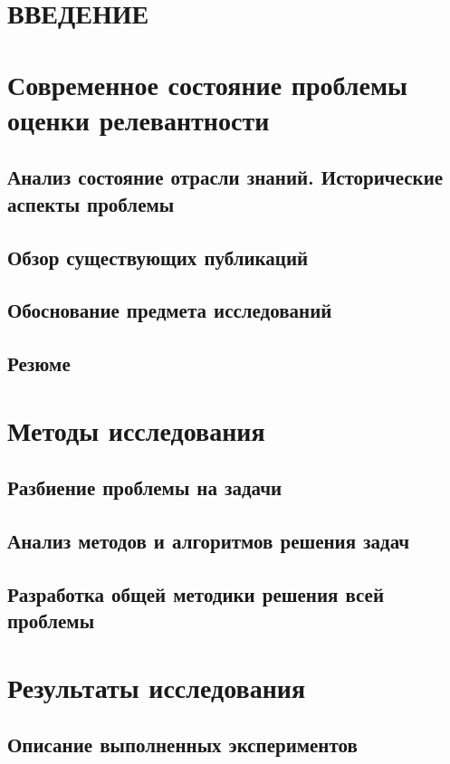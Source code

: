 \documentclass[a4paper,14pt,oneside,openany]{memoir}
\begin{document}
\sloppy

\tableofcontents*
\chapter*{ВВЕДЕНИЕ}

\chapter{Современное состояние проблемы оценки релевантности}
\section{Анализ состояние отрасли знаний. Исторические аспекты проблемы}

\section{Обзор существующих публикаций}

\section{Обоснование предмета исследований}

\section{Резюме}

\chapter{Методы исследования}

\section{Разбиение проблемы на задачи}

\section{Анализ методов и алгоритмов решения задач}

\section{Разработка общей методики решения всей проблемы}

\chapter{Результаты исследования}
\section{Описание выполненных экспериментов}

\end{document}

